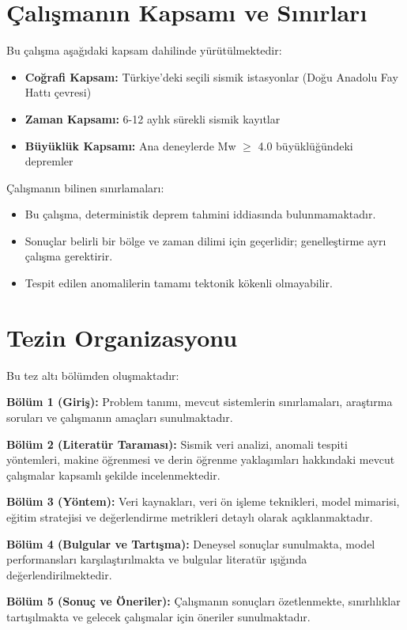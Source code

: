 \section{Çalışmanın Kapsamı ve Sınırları}

Bu çalışma aşağıdaki kapsam dahilinde yürütülmektedir:

\begin{itemize}
    \item \textbf{Coğrafi Kapsam:} Türkiye'deki seçili sismik istasyonlar (Doğu Anadolu Fay Hattı çevresi)
    \item \textbf{Zaman Kapsamı:} 6-12 aylık sürekli sismik kayıtlar
    \item \textbf{Büyüklük Kapsamı:} Ana deneylerde Mw $\geq$ 4.0 büyüklüğündeki depremler
\end{itemize}

Çalışmanın bilinen sınırlamaları:

\begin{itemize}
    \item Bu çalışma, deterministik deprem tahmini iddiasında bulunmamaktadır.
    \item Sonuçlar belirli bir bölge ve zaman dilimi için geçerlidir; genelleştirme ayrı çalışma gerektirir.
    \item Tespit edilen anomalilerin tamamı tektonik kökenli olmayabilir.
\end{itemize}

\section{Tezin Organizasyonu}

Bu tez altı bölümden oluşmaktadır:

\textbf{Bölüm 1 (Giriş):} Problem tanımı, mevcut sistemlerin sınırlamaları, araştırma soruları ve çalışmanın amaçları sunulmaktadır.

\textbf{Bölüm 2 (Literatür Taraması):} Sismik veri analizi, anomali tespiti yöntemleri, makine öğrenmesi ve derin öğrenme yaklaşımları hakkındaki mevcut çalışmalar kapsamlı şekilde incelenmektedir.

\textbf{Bölüm 3 (Yöntem):} Veri kaynakları, veri ön işleme teknikleri, model mimarisi, eğitim stratejisi ve değerlendirme metrikleri detaylı olarak açıklanmaktadır.

\textbf{Bölüm 4 (Bulgular ve Tartışma):} Deneysel sonuçlar sunulmakta, model performansları karşılaştırılmakta ve bulgular literatür ışığında değerlendirilmektedir.

\textbf{Bölüm 5 (Sonuç ve Öneriler):} Çalışmanın sonuçları özetlenmekte, sınırlılıklar tartışılmakta ve gelecek çalışmalar için öneriler sunulmaktadır.
